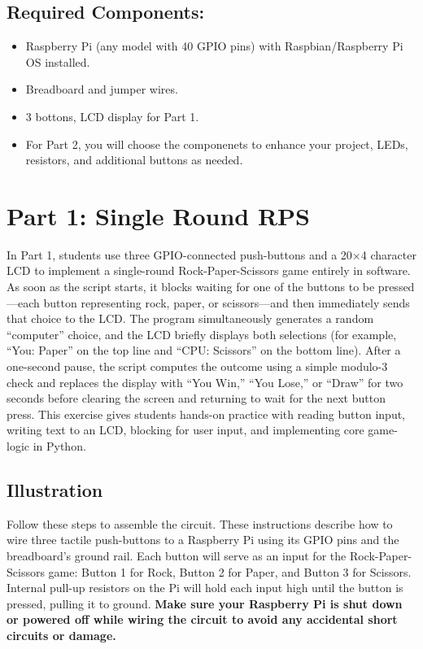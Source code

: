 \documentclass[a4paper,11pt]{article}
\begin{document}
\subsection*{Required Components:}
\begin{itemize}
    \item Raspberry Pi (any model with 40 GPIO pins) with Raspbian/Raspberry Pi OS installed. 
\item Breadboard and jumper wires.
\item 3 bottons, LCD display for Part 1. 
\item For Part 2, you will choose the componenets to enhance your project, LEDs, resistors, and additional buttons as needed.

\end{itemize}


\newpage
\section*{Part 1: Single Round RPS}
In Part 1, students use three GPIO-connected push-buttons and a 20$\times$4 character 
LCD to implement a single-round Rock-Paper-Scissors game entirely in software. 
As soon as the script starts, it blocks waiting for one of the buttons to be pressed—each button representing rock, 
paper, or scissors—and then immediately sends that choice to the LCD. 
The program simultaneously generates a random “computer” choice, and 
the LCD briefly displays both selections 
(for example, “You: Paper” on the top line and “CPU: Scissors” on the bottom line). 
After a one-second pause, the script computes the outcome using a simple modulo-3 
check and replaces the display with “You Win,” “You Lose,” or “Draw” for 
two seconds before clearing the screen and returning to wait for the next button press. 
This exercise gives students hands-on practice with reading button input, writing text to an LCD, 
blocking for user input, and implementing core game-logic in Python.


\subsection*{Illustration}

Follow these steps to assemble the circuit.
These instructions describe how to wire three tactile push-buttons to a Raspberry Pi using its GPIO pins and the breadboard's 
ground rail. Each button will serve as an input for the Rock-Paper-Scissors game: 
Button 1 for Rock, Button 2 for Paper, and Button 3 for Scissors. 
Internal pull-up resistors on the Pi will hold each input high until the button is pressed, pulling it to ground.
\textbf{Make sure your Raspberry Pi 
is shut down or powered off while wiring the circuit to avoid any accidental 
short circuits or damage.}
\end{document}
